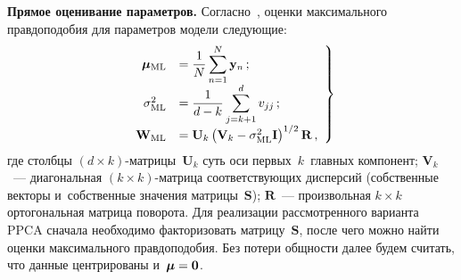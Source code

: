 \begin{multicols}{2}
     \textbf{Прямое оценивание параметров.} Согласно~\cite{3-kri}, оценки 
максимального правдоподобия для па\-ра\-мет\-ров модели следующие:
     \begin{equation}
     \left.
     \begin{array}{rl}
     {\boldsymbol{\mu}}_{\mathrm{ML}} &= \displaystyle \displaystyle\frac{\displaystyle 1\mathstrut}{\displaystyle N\mathstrut}\sum\limits^N_{n=1} 
\mathbf{y}_n\,;\\[6pt]
     \sigma^2_{\mathrm{ML}}&= \displaystyle \displaystyle\frac{\displaystyle 1\mathstrut}{\displaystyle d-k\mathstrut}\sum\limits^d_{j=k+1} 
v_{jj}\,;\\[6pt]
     \mathbf{W}_{\mathrm{ML}} &= \mathbf{U}_k \left(\mathbf{V}_k -
\sigma^2_{\mathrm{ML}}\mathbf{I}\right)^{1/2}\mathbf{R}\,,
     \end{array}
     \right\}
     \label{e3-kri}
     \end{equation}
где столбцы $(d\times k)$-мат\-ри\-цы~$\mathbf{U}_k$ суть оси 
первых~$k$~главных компонент; $\mathbf{V}_k$~--- диагональная $(k\times 
k)$-мат\-ри\-ца соответствующих дисперсий (собственные векторы 
и~собственные значения мат\-ри\-цы~$\mathbf{S}$); $\mathbf{R}$~--- 
произвольная $k\times k$ ортогональная мат\-ри\-ца поворота. Для реализации 
рассмотренного варианта PPCA сначала необходимо факторизовать 
мат\-ри\-цу~$\mathbf{S}$, после чего можно найти оценки максимального 
правдоподобия. Без потери общ\-ности далее будем считать, что данные 
центрированы и~${\boldsymbol{\mu}}\hm=\mathbf{0}$.
     

\end{multicols}
